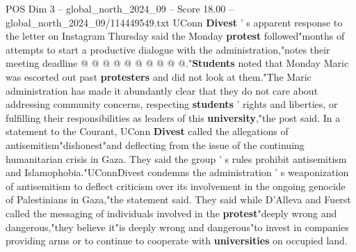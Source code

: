 \begin{textsample}{POS Dim 3 – global\_north\_2024\_09 – Score 18.00 – global\_north\_2024\_09/114449549.txt}
UConn \textbf{Divest} ' s apparent response to the letter on Instagram Thursday said the Monday \textbf{protest} followed"months of attempts to start a productive dialogue with the administration,"notes their meeting deadline @ @ @ @ @ @ @ @ @ @."\textbf{Students} noted that Monday Maric was escorted out past \textbf{protesters} and did not look at them."The Maric administration has made it abundantly clear that they do not care about addressing community concerns, respecting \textbf{students} ' rights and liberties, or fulfilling their responsibilities as leaders of this \textbf{university},"the post said.
In a statement to the Courant, UConn \textbf{Divest} called the allegations of antisemitism"dishonest"and deflecting from the issue of the continuing humanitarian crisis in Gaza.
They said the group ' s rules prohibit antisemitism and Islamophobia."UConnDivest condemns the administration ' s weaponization of antisemitism to deflect criticism over its involvement in the ongoing genocide of Palestinians in Gaza,"the statement said.
They said while D'Alleva and Fuerst called the messaging of individuals involved in the \textbf{protest}"deeply wrong and dangerous,"they believe it"is deeply wrong and dangerous"to invest in companies providing arms or to continue to cooperate with \textbf{universities} on occupied land.

\end{textsample}
